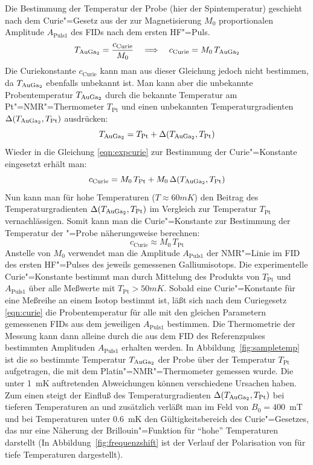 Die Bestimmung der Temperatur der Probe (hier der Spintemperatur) geschieht nach dem Curie"=Gesetz aus der zur
Magnetisierung $M_0$ proportionalen Amplitude $A_\mathrm{Puls1}$ des FIDs nach dem ersten HF"=Puls.
	\begin{equation}
		\label{eqn:expcurie}
		T_\aug=\frac{c_\mathrm{Curie}}{M_0}\quad\Longrightarrow\quad c_\mathrm{Curie}=M_0\,T_\aug
	\end{equation}
Die Curiekonstante $c_\mathrm{Curie}$ kann man aus dieser Gleichung jedoch nicht bestimmen, da
$T_\aug$ ebenfalls unbekannt ist. Man kann aber die unbekannte Probentemperatur $T_\aug$ durch die
bekannte Temperatur am Pt"=NMR"=Thermometer $T_\mathrm{Pt}$ und einen unbekannten Temperaturgradienten
$\Delta(T_\aug,T_\mathrm{Pt})$ ausdrücken:
	\begin{equation}
		T_\aug=T_\mathrm{Pt} + \Delta(T_\aug,T_\mathrm{Pt})
	\end{equation}
Wieder in die Gleichung \eqref{eqn:expcurie} zur Bestimmung der Curie"=Konstante eingesetzt erhält man:
	\begin{equation}
		c_\mathrm{Curie}=M_0\,T_\mathrm{Pt} + M_0\,\Delta(T_\aug,T_\mathrm{Pt})
	\end{equation}
Nun kann man für hohe Temperaturen ($T\approx60mK$) den Beitrag des Temperaturgradienten
$\Delta(T_\aug,T_\mathrm{Pt})$ im Vergleich zur Temperatur $T_\mathrm{Pt}$ vernachlässigen.
Somit kann man die Curie"=Konstante zur Bestimmung der Temperatur der \aug"=Probe näherungsweise
berechnen:
	\begin{equation}
		c_\mathrm{Curie}\approx M_0\,T_\mathrm{Pt}
	\end{equation}
Anstelle von $M_0$ verwendet man die Amplitude $A_\mathrm{Puls1}$ der NMR"=Linie im FID des ersten
HF"=Pulses des jeweils gemessenen Galliumisotops. Die experimentelle Curie"=Konstante bestimmt man
durch Mittelung des Produkts von $T_\mathrm{Pt}$ und $A_\mathrm{Puls1}$ über alle Meßwerte mit
$T_\mathrm{Pt}>50mK$. Sobald eine Curie"=Konstante für eine Meßreihe an einem Isotop bestimmt ist,
läßt sich nach dem Curiegesetz \eqref{eqn:curie} die Probentemperatur für alle mit den gleichen
Parametern gemessenen FIDs aus dem jeweiligen $A_\mathrm{Puls1}$ bestimmen. Die Thermometrie der
Messung kann dann alleine durch die aus dem FID des Referenzpulses bestimmten Amplituden
$A_\mathrm{Puls1}$ erhalten werden. In Abbildung~\ref{fig:sampletemp} ist die so bestimmte
Temperatur $T_\aug$ der Probe über der Temperatur $T_\mathrm{Pt}$ aufgetragen, die mit dem
Platin"=NMR"=Thermometer gemessen wurde. Die unter 1~mK auftretenden Abweichungen können
verschiedene Ursachen haben. Zum einen steigt der Einfluß des Temperaturgradienten
$\Delta(T_\aug,T_\mathrm{Pt})$ bei tieferen Temperaturen an und zusätzlich verläßt man im Feld von
$B_0=400$~mT und bei Temperaturen unter 0.6~mK den Gültigkeitsbereich des Curie"=Gesetzes, das nur
eine Näherung der Brillouin"=Funktion für "`hohe"' Temperaturen darstellt (In
Abbildung~\ref{fig:frequenzshift} ist der Verlauf der Polarisation von \aug{} für tiefe
Temperaturen dargestellt).

